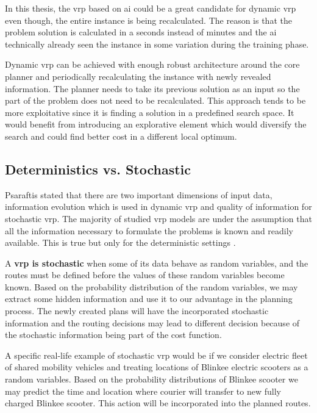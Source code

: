     In this thesis, the \gls{vrp} based on \gls{ai} could be a great candidate for dynamic \gls{vrp} even though, the entire instance is being recalculated. The reason is that the problem solution is calculated in a seconds instead of minutes and the \gls{ai} technically already seen the instance in some variation during the training phase.
    
    Dynamic \gls{vrp} can be achieved with enough robust architecture around the core planner and periodically recalculating the instance with newly revealed information. The planner needs to take its previous solution as an input so the part of the problem does not need to be recalculated. This approach tends to be more exploitative since it is finding a solution in a predefined search space. It would benefit from introducing an explorative element which would diversify the search and could find better cost in a different local optimum.

    \subsection{Deterministics vs. Stochastic}\label{dynamic}
    Psaraftis \cite{psaraftis} stated that there are two important dimensions of input data, information evolution which is used in dynamic \gls{vrp} and quality of information for stochastic \gls{vrp}. The majority of studied \gls{vrp} models are under the assumption that all the information necessary to formulate the problems is known and readily available. This is true but only for the deterministic settings \cite{vrp-bible}.
    
    A \textbf{\gls{vrp} is stochastic} \cite{stochastic-vrp} when some of its data behave as random variables, and the routes must be defined before the values of these random variables become known. Based on the probability distribution of the random variables, we may extract some hidden information and use it to our advantage in the planning process. The newly created plans will have the incorporated stochastic information and the routing decisions may lead to different decision because of the stochastic information being part of the cost function.
    
    A specific real-life example of stochastic \gls{vrp} would be if we consider electric fleet of shared mobility vehicles and treating locations of Blinkee electric scooters as a random variables. Based on the probability distributions of Blinkee scooter we may predict the time and location where courier will transfer to new fully charged Blinkee scooter. This action will be incorporated into the planned routes.
    
